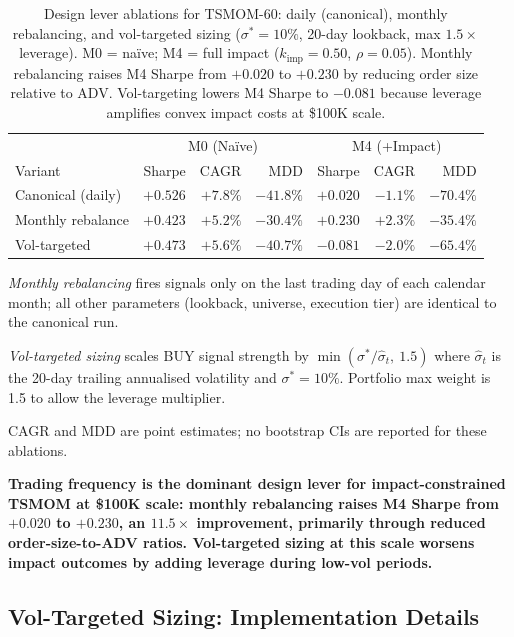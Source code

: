\documentclass[12pt]{article}
\newcommand{\finding}[1]{\textbf{#1}}
\newcommand{\kimp}{k_{\mathrm{imp}}}
\begin{document}
\begin{table}[H]
\centering
\caption{Design lever ablations for TSMOM-60: daily (canonical),
monthly rebalancing, and vol-targeted sizing
($\sigma^* = 10\%$, 20-day lookback, max $1.5\times$ leverage).
M0 = na\"{i}ve; M4 = full impact ($\kimp=0.50$, $\rho=0.05$).
Monthly rebalancing raises M4 Sharpe from $+0.020$ to $+0.230$
by reducing order size relative to ADV.
Vol-targeting lowers M4 Sharpe to $-0.081$ because leverage amplifies
convex impact costs at \$100K scale.}
\label{tab:ablation_freq}
\small
\begin{tabular}{lrrr|rrr}
\toprule
 & \multicolumn{3}{c|}{M0 (Na\"{i}ve)} & \multicolumn{3}{c}{M4 (+Impact)} \\
Variant         & Sharpe & CAGR  & MDD    & Sharpe & CAGR   & MDD \\
\midrule
Canonical (daily) & $+0.526$ & $+7.8\%$ & $-41.8\%$ & $+0.020$ & $-1.1\%$ & $-70.4\%$ \\
Monthly rebalance & $+0.423$ & $+5.2\%$ & $-30.4\%$ & $\mathbf{+0.230}$ & $+2.3\%$ & $-35.4\%$ \\
Vol-targeted      & $+0.473$ & $+5.6\%$ & $-40.7\%$ & $-0.081$ & $-2.0\%$ & $-65.4\%$ \\
\bottomrule
\end{tabular}
\begin{tablenotes}\small
\item \textit{Monthly rebalancing} fires signals only on the last trading
day of each calendar month; all other parameters (lookback, universe,
execution tier) are identical to the canonical run.
\item \textit{Vol-targeted sizing} scales BUY signal strength by
$\min(\sigma^* / \hat\sigma_t,\ 1.5)$ where $\hat\sigma_t$ is the
20-day trailing annualised volatility and $\sigma^* = 10\%$.
Portfolio max weight is 1.5 to allow the leverage multiplier.
\item CAGR and MDD are point estimates; no bootstrap CIs are reported
for these ablations.
\end{tablenotes}
\end{table}

\finding{Trading frequency is the dominant design lever for
impact-constrained TSMOM at \$100K scale: monthly rebalancing raises
M4 Sharpe from $+0.020$ to $+0.230$, an $11.5\times$ improvement,
primarily through reduced order-size-to-ADV ratios.
Vol-targeted sizing at this scale worsens impact outcomes by adding
leverage during low-vol periods.}

\subsection{Vol-Targeted Sizing: Implementation Details}
\label{app:vol_target_spec}
\end{document}

